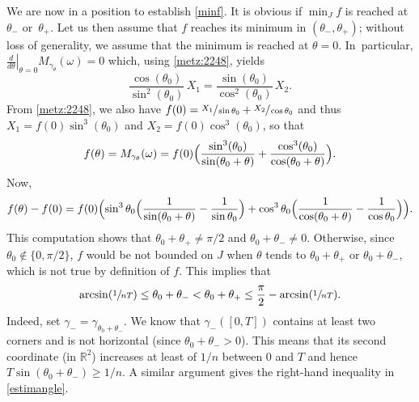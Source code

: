 \documentclass[JEP,XML,SOM,Unicode, NoEqCountersInSection,NoFloatCountersInSection,published]{cedram}
\def\R{\mathbb{R}}
\theoremstyle{definition}
\begin{document}
We are now in a position to establish \eqref{minf}. It is obvious if $\min_J f$ is reached at ${\theta_-}$ or~$\theta_+$. Let us then assume that $f$ reaches its minimum {in $(\theta_-,\theta_+)$}; without loss of generality, we assume that the minimum is reached at $\theta=0$. In~particular, $\left.\frac{d}{d\theta}\right|_{\theta=0}M_{\gamma_\theta}(\omega)=0$
which, using \eqref{metz:2248}, yields
\[
\frac{\cos (\theta_0)}{\sin ^2(\theta_0)}\,X_1=\frac{\sin (\theta_0)}{\cos ^2(\theta_0)}\,X_2.
\]
From \eqref{metz:2248}, we also have $f(0)=\sfrac{X_1}{\sin \theta_0}+\sfrac{X_2}{\cos \theta_0}$ and thus
$X_1=f(0) \sin^3(\theta_0)$ and $X_2=f(0) \cos^3(\theta_0)$, so that
\[
f(\theta)= M_{\gamma_\theta}(\omega)= f(0) \Bigl( \frac{\sin^3(\theta_0)}{\sin(\theta_0+\theta)} + \frac{\cos^3(\theta_0)}{\cos(\theta_0+\theta)} \Bigr).
\]
Now,
\[
f(\theta)-f(0)=f(0) \Bigl(\sin^3\theta_0\Bigl(\frac{1}{\sin (\theta_0+\theta)}-\frac{1}{\sin \theta_0}\Bigr) +\cos^3\theta_0\Bigl(\frac{1}{\cos (\theta_0+\theta)}-\frac{1}{\cos \theta_0}\Bigr)\Bigr).
\]
This computation shows that $\theta_0 + \theta_+ \neq \pi/2$ {and} $\theta_0+\theta_-\neq 0$. Otherwise, since $\theta_0 \notin \{0, \pi/2\}$, $f$ would be not bounded on $J$ when $\theta$ tends to $\theta_0 + \theta_+$ or $\theta_0 + \theta_-$, which is not true by definition of $f$.
This implies that
\begin{equation} \label{estimangle}
\arcsin( \sfrac{1}{nT}) \leq \theta_0 + \theta_- < \theta_0 + \theta_+ \leq \frac{\pi}{2} -\arcsin( \sfrac{1}{nT}).
\end{equation}
Indeed, set $\gamma_- = \gamma_{\theta_0+\theta_-}$. We know that $\gamma_-([0,T])$ contains at least two corners and is not horizontal (since $\theta_0+\theta_->0$). This means that its second coordinate (in $\R^2$) increases at least of $1/n$ between $0$ and $T$ and hence $T \sin(\theta_0 + \theta_-) \geq 1/n$. A similar argument gives the right-hand inequality in \eqref{estimangle}.
\end{document}
